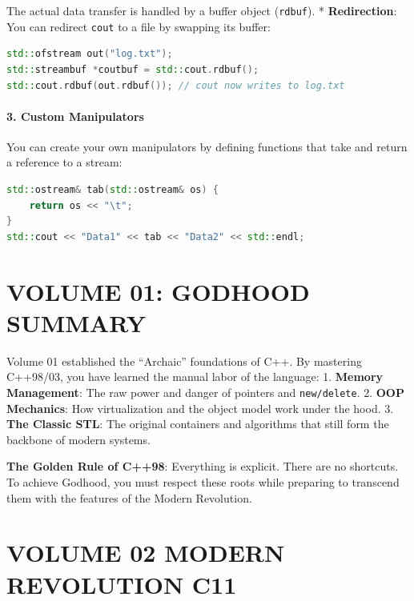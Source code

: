 The actual data transfer is handled by a buffer object
(\passthrough{\lstinline!rdbuf!}). * \textbf{Redirection}: You can
redirect \passthrough{\lstinline!cout!} to a file by swapping its
buffer:

\begin{lstlisting}[language={C++}]
std::ofstream out("log.txt");
std::streambuf *coutbuf = std::cout.rdbuf();
std::cout.rdbuf(out.rdbuf()); // cout now writes to log.txt
\end{lstlisting}

\hypertarget{custom-manipulators}{%
\paragraph{3. Custom Manipulators}\label{custom-manipulators}}

You can create your own manipulators by defining functions that take and
return a reference to a stream:

\begin{lstlisting}[language={C++}]
std::ostream& tab(std::ostream& os) {
    return os << "\t";
}
std::cout << "Data1" << tab << "Data2" << std::endl;
\end{lstlisting}

\hypertarget{volume-01-godhood-summary}{%
\section{VOLUME 01: GODHOOD SUMMARY}\label{volume-01-godhood-summary}}

Volume 01 established the ``Archaic'' foundations of C++. By mastering
C++98/03, you have learned the manual labor of the language: 1.
\textbf{Memory Management}: The raw power and danger of pointers and
\passthrough{\lstinline!new/delete!}. 2. \textbf{OOP Mechanics}: How
virtualization and the object model work under the hood. 3. \textbf{The
Classic STL}: The original containers and algorithms that still form the
backbone of modern systems.

\textbf{The Golden Rule of C++98}: Everything is explicit. There are no
shortcuts. To achieve Godhood, you must respect these roots while
preparing to transcend them with the features of the Modern Revolution.

\hypertarget{volume-02-modern-revolution-c11}{%
\section{VOLUME 02 MODERN REVOLUTION
C11}\label{volume-02-modern-revolution-c11}}
